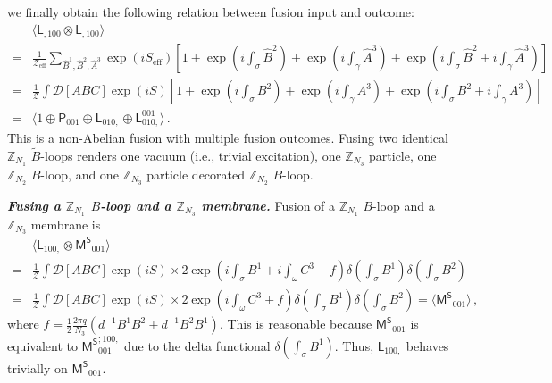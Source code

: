\documentclass[11pt,nofootinbib,preprint]{revtex4-1}
\begin{document}
we finally    obtain the following relation between fusion input and outcome:
\begin{align}
	&\langle \mathsf{L}_{,100}\otimes \mathsf{L}_{,100}\rangle \,\, \nonumber
	\\
	=&\frac{1}{\mathcal{Z} _{\mathrm{eff}}}\!\sum_{\hat{B}^1,\hat{B}^2,\hat{A}^3}{\!}\exp \!\left( iS_{\mathrm{eff}} \right) \!\left[ \!1+\exp \left( i\int_{\sigma}{\hat{B}^2} \right) +\exp \left( i\int_{\gamma}{\hat{A}^3} \right) +\exp \left( i\int_{\sigma}{\hat{B}^2}+i\int_{\gamma}{\hat{A}^3} \right) \! \right] \nonumber
	\\
	\!\!=&\frac{1}{\mathcal{Z}}\!\!\int{\!}\!\mathcal{D} \!\left[ ABC \right] \!\exp \left( iS \right) \!\!\left[ 1\!+\!\exp \left( i\int_{\sigma}{\!}B^2 \right) \!+\!\exp \left( \!i\int_{\gamma}{\!}A^3\! \right) \!+\!\exp \left( i\int_{\sigma}{\!}B^2+i\int_{\gamma}{\!}A^3 \right) \right] \nonumber
	\\
	=&\langle 1\oplus \mathsf{P}_{001}\oplus \mathsf{L}_{010,}\oplus \mathsf{L}_{010,}^{001}\rangle \label{equation_L,100L,100}\,.
\end{align}
This is a non-Abelian fusion with multiple fusion outcomes. Fusing two identical $\mathbb{Z} _{N_1}$ $\tilde{B}$-loops renders   one  vacuum (i.e., trivial excitation), one $\mathbb{Z} _{N_3}$ particle, one $\mathbb{Z} _{N_2}$ $B$-loop, and one $\mathbb{Z} _{N_3}$ particle decorated $\mathbb{Z} _{N_2}$ $B$-loop. 


\textbf{\textit{Fusing  a $\mathbb{Z} _{N_1}$ $B$-loop and a $\mathbb{Z} _{N_3}$ membrane.}}
Fusion of a $\mathbb{Z} _{N_1}$ $B$-loop and a $\mathbb{Z} _{N_3}$ membrane is
\begin{align}
	&	\langle \mathsf{L}_{100,}\otimes \mathsf{M^S}_{001} \rangle \nonumber\\
	=&\frac{1}{\mathcal{Z}}\int\!\! \mathcal{D} \!\left[ ABC \right]\! \exp \left( iS \right) \times2\exp \left( i\int_{\sigma}{B^1}+i\int_{\omega}{C^3+f} \right)\delta \left( \int_{\sigma}{B^1} \right) \delta \left( \int_{\sigma}{B^2} \right) \nonumber
	\\
	=&\frac{1}{\mathcal{Z}}\int\!\! \mathcal{D} \!\left[ ABC \right]\!   \exp \left( iS \right) \times 2\exp \left( i\int_{\omega}{C^3+f} \right)\delta \left( \int_{\sigma}{B^1} \right) \delta \left( \int_{\sigma}{B^2} \right) =\langle \mathsf{M^S}_{001} \rangle \,,
\end{align}
where $f=\frac{1}{2}\frac{2\pi q}{N_3}\left( d^{-1}B^1B^2+d^{-1}B^2B^1 \right) $.
This is reasonable because $\mathsf{M^S}_{001}$ is equivalent to $\mathsf{M^S}_{001}^{;100,}$ due to the delta functional $\delta \left( \int_{\sigma}{B^1} \right) $. Thus, $\mathsf{L}_{100,}$ behaves trivially on $\mathsf{M^S}_{001}$.
\end{document}
